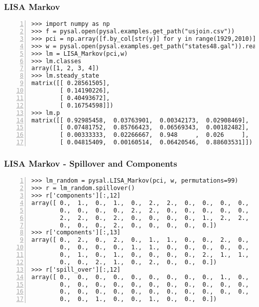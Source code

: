 \documentclass{beamer}
\begin{document}
\begin{frame}[fragile]
  \frametitle{LISA Markov}
  \begin{footnotesize}
  \begin{Verbatim}[numbers=left]
>>> import numpy as np
>>> f = pysal.open(pysal.examples.get_path("usjoin.csv"))
>>> pci = np.array([f.by_col[str(y)] for y in range(1929,2010)]).transpose()
>>> w = pysal.open(pysal.examples.get_path("states48.gal")).read()
>>> lm = LISA_Markov(pci,w)
>>> lm.classes
array([1, 2, 3, 4])
>>> lm.steady_state
matrix([[ 0.28561505],
        [ 0.14190226],
        [ 0.40493672],
        [ 0.16754598]])
>>> lm.p
matrix([[ 0.92985458,  0.03763901,  0.00342173,  0.02908469],
        [ 0.07481752,  0.85766423,  0.06569343,  0.00182482],
        [ 0.00333333,  0.02266667,  0.948     ,  0.026     ],
        [ 0.04815409,  0.00160514,  0.06420546,  0.88603531]])
\end{Verbatim} 
\end{footnotesize}
\end{frame}


\begin{frame}[fragile]
  \frametitle{LISA Markov - Spillover and Components}
  \begin{footnotesize}
  \begin{Verbatim}[numbers=left]
>>> lm_random = pysal.LISA_Markov(pci, w, permutations=99)
>>> r = lm_random.spillover()
>>> r['components'][:,12]
array([ 0.,  1.,  0.,  1.,  0.,  2.,  2.,  0.,  0.,  0.,  0.,  0.,  0.,
        0.,  0.,  0.,  0.,  2.,  2.,  0.,  0.,  0.,  0.,  0.,  0.,  1.,
        2.,  2.,  0.,  2.,  0.,  0.,  0.,  0.,  1.,  2.,  2.,  0.,  0.,
        0.,  0.,  0.,  2.,  0.,  0.,  0.,  0.,  0.])
>>> r['components'][:,13]
array([ 0.,  2.,  0.,  2.,  0.,  1.,  1.,  0.,  0.,  2.,  0.,  0.,  0.,
        0.,  0.,  0.,  0.,  1.,  1.,  0.,  0.,  0.,  0.,  0.,  0.,  2.,
        0.,  1.,  0.,  1.,  0.,  0.,  0.,  0.,  2.,  1.,  1.,  0.,  0.,
        0.,  0.,  2.,  1.,  0.,  2.,  0.,  0.,  0.])
>>> r['spill_over'][:,12]
array([ 0.,  0.,  0.,  0.,  0.,  0.,  0.,  0.,  0.,  1.,  0.,  0.,  0.,
        0.,  0.,  0.,  0.,  0.,  0.,  0.,  0.,  0.,  0.,  0.,  0.,  0.,
        0.,  0.,  0.,  0.,  0.,  0.,  0.,  0.,  0.,  0.,  0.,  0.,  0.,
        0.,  0.,  1.,  0.,  0.,  1.,  0.,  0.,  0.])

\end{Verbatim} 
\end{footnotesize}
\end{frame}
\end{document}
